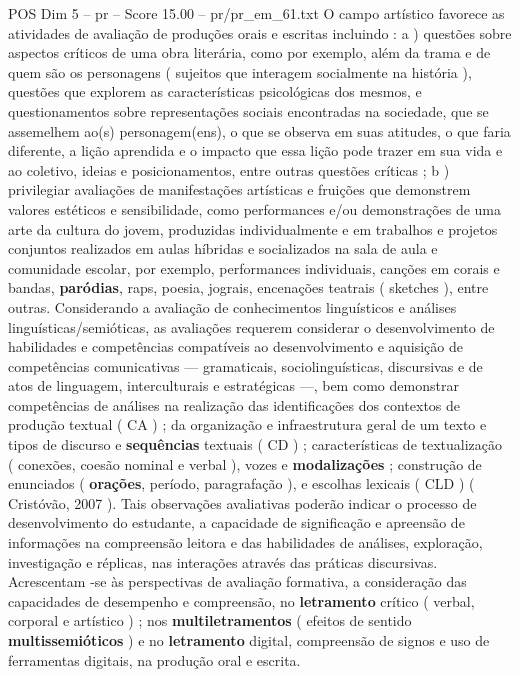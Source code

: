 \begin{textsample}{POS Dim 5 – pr – Score 15.00 – pr/pr\_em\_61.txt}
O campo artístico favorece as atividades de avaliação de produções orais e escritas incluindo : a ) questões sobre aspectos críticos de uma obra literária, como por exemplo, além da trama e de quem são os personagens ( sujeitos que interagem socialmente na história ), questões que explorem as características psicológicas dos mesmos, e questionamentos sobre representações sociais encontradas na sociedade, que se assemelhem ao(s) personagem(ens), o que se observa em suas atitudes, o que faria diferente, a lição aprendida e o impacto que essa lição pode trazer em sua vida e ao coletivo, ideias e posicionamentos, entre outras questões críticas ; b ) privilegiar avaliações de manifestações artísticas e fruições que demonstrem valores estéticos e sensibilidade, como performances e/ou demonstrações de uma arte da cultura do jovem, produzidas individualmente e em trabalhos e projetos conjuntos realizados em aulas híbridas e socializados na sala de aula e comunidade escolar, por exemplo, performances individuais, canções em corais e bandas, \textbf{paródias}, raps, poesia, jograis, encenações teatrais ( sketches ), entre outras.
Considerando a avaliação de conhecimentos linguísticos e análises linguísticas/semióticas, as avaliações requerem considerar o desenvolvimento de habilidades e competências compatíveis ao desenvolvimento e aquisição de competências comunicativas — gramaticais, sociolinguísticas, discursivas e de atos de linguagem, interculturais e estratégicas —, bem como demonstrar competências de análises na realização das identificações dos contextos de produção textual ( CA ) ; da organização e infraestrutura geral de um texto e tipos de discurso e \textbf{sequências} textuais ( CD ) ; características de textualização ( conexões, coesão nominal e verbal ), vozes e \textbf{modalizações} ; construção de enunciados ( \textbf{orações}, período, paragrafação ), e escolhas lexicais ( CLD ) ( Cristóvão, 2007 ).
Tais observações avaliativas poderão indicar o processo de desenvolvimento do estudante, a capacidade de significação e apreensão de informações na compreensão leitora e das habilidades de análises, exploração, investigação e réplicas, nas interações através das práticas discursivas.
Acrescentam -se às perspectivas de avaliação formativa, a consideração das capacidades de desempenho e compreensão, no \textbf{letramento} crítico ( verbal, corporal e artístico ) ; nos \textbf{multiletramentos} ( efeitos de sentido \textbf{multissemióticos} ) e no \textbf{letramento} digital, compreensão de signos e uso de ferramentas digitais, na produção oral e escrita.

\end{textsample}

